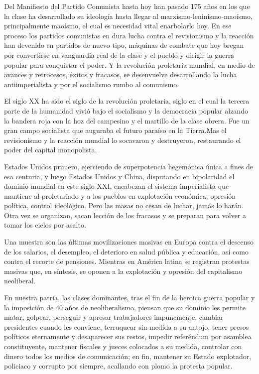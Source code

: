 \documentclass[
  jou,
  floatsintext,
  longtable,
  a4paper,
  nolmodern,
  notxfonts,
  notimes,
  12pt,
  colorlinks=true,linkcolor=blue,citecolor=blue,urlcolor=blue]{apa7}
\begin{document}
Del Manifiesto del Partido Comunista hasta hoy han pasado 175 años en
los que la clase ha desarrollado su ideología hasta llegar al
marxismo-leninismo-maoísmo, principalmente maoísmo, el cual es necesidad
vital enarbolarlo hoy. En ese proceso los partidos comunistas en dura
lucha contra el revisionismo y la reacción han devenido en partidos de
nuevo tipo, máquinas de combate que hoy bregan por convertirse en
vanguardia real de la clase y el pueblo y dirigir la guerra popular para
conquistar el poder. Y la revolución proletaria mundial, en medio de
avances y retrocesos, éxitos y fracasos, se desenvuelve desarrollando la
lucha antiimperialista y por el socialismo rumbo al comunismo.

El siglo XX ha sido el siglo de la revolución proletaria, siglo en el
cual la tercera parte de la humanidad vivió bajo el socialismo y la
democracia popular alzando la bandera roja con la hoz del campesino y el
martillo de la clase obrera. Fue un gran campo socialista que auguraba
el futuro paraíso en la Tierra.Mas el revisionismo y la reacción mundial
lo socavaron y destruyeron, restaurando el poder del capital
monopolista.

Estados Unidos primero, ejerciendo de superpotencia hegemónica única a
fines de esa centuria, y luego Estados Unidos y China, disputando en
bipolaridad el dominio mundial en este siglo XXI, encabezan el sistema
imperialista que mantiene al proletariado y a los pueblos en explotación
económica, opresión política, control ideológico. Pero las masas no
cesan de luchar, jamás lo harán. Otra vez se organizan, sacan lección de
los fracasos y se preparan para volver a tomar los cielos por asalto.

Una muestra son las últimas movilizaciones masivas en Europa contra el
descenso de los salarios, el desempleo, el deterioro en salud pública y
educación, así como contra el recorte de pensiones. Mientras en América
latina se registran protestas masivas que, en síntesis, se oponen a la
explotación y opresión del capitalismo neoliberal.

En nuestra patria, las clases dominantes, tras el fin de la heroica
guerra popular y la imposición de 40 años de neoliberalismo, piensan que
su dominio les permite matar, golpear, perseguir y apresar trabajadores
impunemente, cambiar presidentes cuando les conviene, terruquear sin
medida a su antojo, tener presos políticos eternamente y desaparecer sus
restos, impedir referéndum por asamblea constituyente, mantener fiscales
y jueces colocados a su medida, controlar con dinero todos los medios de
comunicación; en fin, mantener su Estado explotador, policiaco y
corrupto por siempre, acallando con plomo la protesta popular.
\end{document}
